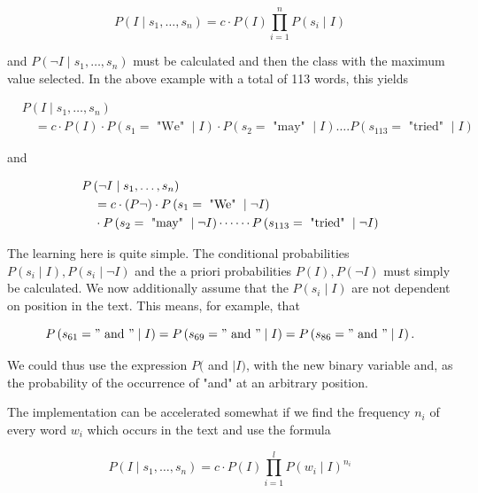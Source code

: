 \documentclass[10pt]{book}
\begin{document}
\begin{equation*}
P\left(I \mid s_{1}, \ldots, s_{n}\right)=c \cdot P(I) \prod_{i=1}^{n} P\left(s_{i} \mid I\right) \tag{8.9}
\end{equation*}


and $P\left(\neg I \mid s_{1}, \ldots, s_{n}\right)$ must be calculated and then the class with the maximum value selected. In the above example with a total of 113 words, this yields

$$
\begin{aligned}
& P\left(I \mid s_{1}, \ldots, s_{n}\right) \\
& \quad=c \cdot P(I) \cdot P\left(s_{1}=\text { "We" } \mid I\right) \cdot P\left(s_{2}=\text { "may" } \mid I\right) \ldots . P\left(s_{113}=\text { "tried" } \mid I\right)
\end{aligned}
$$

and

$$
\begin{aligned}
& P\left(\neg I \mid s_{1}, \ldots, s_{n}\right) \\
& \quad=c \cdot(P \neg) \cdot P\left(s_{1}=\text { "We" } \mid \neg I\right) \\
& \quad \cdot P\left(s_{2}=\text { "may" } \mid \neg I\right) \cdots \cdots P\left(s_{113}=\text { "tried" } \mid \neg I\right)\index{K-means}\index{Manhattan distance}
\end{aligned}
$$

The learning here is quite simple. The conditional probabilities $P\left(s_{i} \mid I\right), P\left(s_{i} \mid \neg I\right)$ and the a priori probabilities $P(I), P(\neg I)$ must simply be calculated. We now additionally assume that the $P\left(s_{i} \mid I\right)$ are not dependent on position in the text. This means, for example, that

$$
P\left(s_{61}=" \text { and } " \mid I\right)=P\left(s_{69}=" \text { and } " \mid I\right)=P\left(s_{86}=" \text { and } " \mid I\right) .
$$

We could thus use the expression $P($ and $\mid I)$, with the new binary variable and, as the probability of the occurrence of "and" at an arbitrary position.

The implementation can be accelerated somewhat if we find the frequency $n_{i}$ of every word $w_{i}$ which occurs in the text and use the formula


\begin{equation*}
P\left(I \mid s_{1}, \ldots, s_{n}\right)=c \cdot P(I) \prod_{i=1}^{l} P\left(w_{i} \mid I\right)^{n_{i}} \tag{8.10}
\end{equation*}
\end{document}
